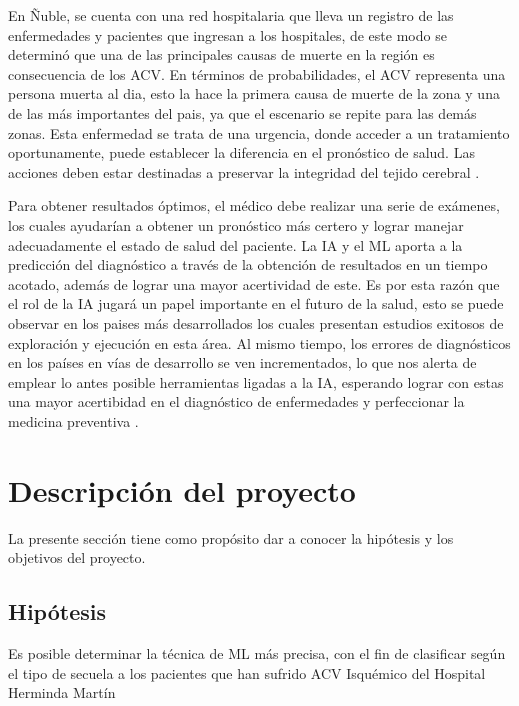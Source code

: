 \par En Ñuble, se cuenta con una red hospitalaria que lleva un registro de las enfermedades y pacientes que ingresan a los hospitales, de este modo se determinó que una de las principales causas de muerte en la región es consecuencia de los ACV. En términos de probabilidades, el ACV representa una persona muerta al dia, esto la hace la primera causa de muerte de la zona y una de las más importantes del pais, ya que el escenario se repite para las demás zonas. Esta enfermedad se trata de una urgencia, donde acceder a un tratamiento oportunamente, puede establecer la diferencia en el pronóstico de salud. Las acciones deben estar destinadas a preservar la integridad del tejido cerebral \cite{ServicioSaludNuble}.\\
\par Para obtener resultados óptimos, el médico debe realizar una serie de exámenes,  los cuales  ayudarían a obtener  un pronóstico más  certero y  lograr manejar  adecuadamente el estado de salud del paciente. La IA y el ML  aporta a la predicción del diagnóstico a través  de la obtención de resultados en un tiempo acotado,  además de lograr una mayor acertividad de este.  Es por esta razón que el rol de la IA jugará un papel importante  en el  futuro de la salud,  esto se puede observar  en los paises más desarrollados   los cuales  presentan estudios exitosos   de  exploración y ejecución en  esta área. Al mismo tiempo, los errores de diagnósticos en los países en vías de desarrollo se ven incrementados, lo que nos alerta de emplear  lo antes posible  herramientas ligadas a la IA, esperando lograr  con estas  una mayor  acertibidad  en el diagnóstico de enfermedades y  perfeccionar la medicina preventiva \cite{Curioso2020}.


\doublespacing
\section{Descripción del proyecto}
La presente sección tiene como propósito dar a conocer la hipótesis y los objetivos del proyecto.\\

\doublespacing
\subsection{Hipótesis}
Es posible determinar la técnica de ML más precisa, con el fin de clasificar según el tipo de secuela a los pacientes que han sufrido ACV Isquémico del Hospital Herminda Martín\\

